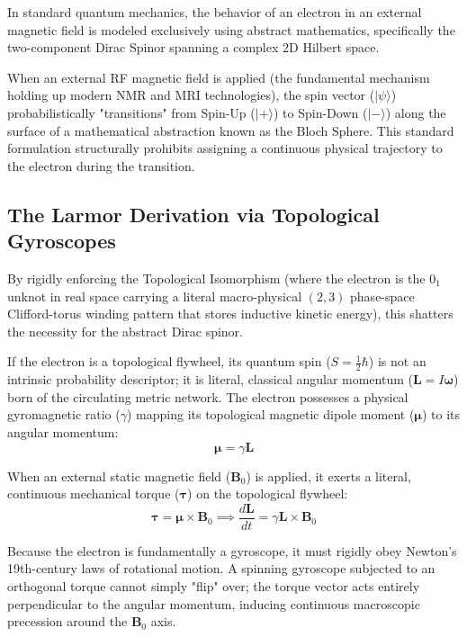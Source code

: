 In standard quantum mechanics, the behavior of an electron in an external magnetic field is modeled exclusively using abstract mathematics, specifically the two-component Dirac Spinor spanning a complex 2D Hilbert space. 

When an external RF magnetic field is applied (the fundamental mechanism holding up modern NMR and MRI technologies), the spin vector ($| \psi \rangle$) probabilistically "transitions" from Spin-Up ($|+\rangle$) to Spin-Down ($|-\rangle$) along the surface of a mathematical abstraction known as the Bloch Sphere. This standard formulation structurally prohibits assigning a continuous physical trajectory to the electron during the transition.

\subsection{The Larmor Derivation via Topological Gyroscopes}
By rigidly enforcing the Topological Isomorphism (where the electron is the $0_1$ unknot in real space carrying a literal macro-physical $(2,3)$ phase-space Clifford-torus winding pattern that stores inductive kinetic energy), this shatters the necessity for the abstract Dirac spinor. 

If the electron is a topological flywheel, its quantum spin ($S = \frac{1}{2}\hbar$) is not an intrinsic probability descriptor; it is literal, classical angular momentum ($\mathbf{L} = I\boldsymbol{\omega}$) born of the circulating metric network. The electron possesses a physical gyromagnetic ratio ($\gamma$) mapping its topological magnetic dipole moment ($\boldsymbol{\mu}$) to its angular momentum:
\begin{equation}
    \boldsymbol{\mu} = \gamma \mathbf{L}
\end{equation}

When an external static magnetic field ($\mathbf{B}_0$) is applied, it exerts a literal, continuous mechanical torque ($\boldsymbol{\tau}$) on the topological flywheel:
\begin{equation}
    \boldsymbol{\tau} = \boldsymbol{\mu} \times \mathbf{B}_0 \implies \frac{d\mathbf{L}}{dt} = \gamma \mathbf{L} \times \mathbf{B}_0
\end{equation}

Because the electron is fundamentally a gyroscope, it must rigidly obey Newton's 19th-century laws of rotational motion. A spinning gyroscope subjected to an orthogonal torque cannot simply "flip" over; the torque vector acts entirely perpendicular to the angular momentum, inducing continuous macroscopic precession around the $\mathbf{B}_0$ axis.

